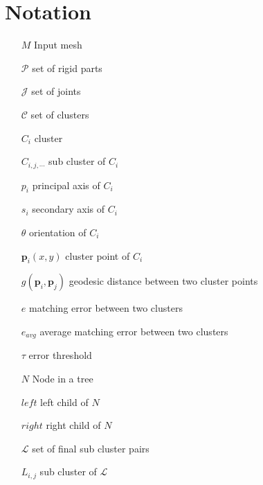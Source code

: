 \chapter{Notation}
\label{cha:Notation}

\begin{itemize}
	\item[$M$] Input mesh
	\item[$\mathcal{P}$] set of rigid parts
	\item[$\mathcal{J}$] set of joints
	\item[$\mathcal{C}$] set of clusters
	\item[$C_i$] cluster
	\item[$C_{i,j,\cdots}$] sub cluster of $C_i$
	\item[$p_i$] principal axis of $C_i$
	\item[$s_i$] secondary axis of $C_i$
	\item[$\theta$] orientation of $C_i$
	\item[$\boldsymbol{p}_i(x,y)$] cluster point of $C_i$
	\item[$g(\boldsymbol{p}_i,\boldsymbol{p}_j)$] geodesic distance between two cluster points
	\item[$e$] matching error between two clusters
	\item[$e_{avg}$] average matching error between two clusters 
	\item[$\tau$] error threshold 
	\item[$N$] Node in a tree
	\item[$\mathit{left}$] left child of $N$
	\item[$\mathit{right}$] right child of $N$
	\item[$\mathcal{L}$] set of final sub cluster pairs
	\item[$L_{i,j}$] sub cluster of $\mathcal{L}$	
\end{itemize}


